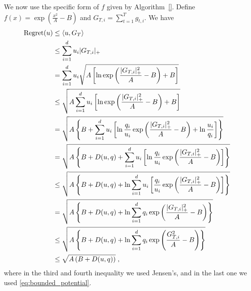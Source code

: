 We now use the specific form of $f$ given by Algorithm~\ref{}.
Define $f(x)= \exp(\frac{x^2}{A} - B)$ and $G_{T,i}=\sum_{t=1}^T g_{t,i}$.
We have
\begin{align*}
\operatorname{Regret}(u) & \le \langle u, G_T \rangle \\
& \le \sum_{i=1}^d u_i |G_{T,i}|_+ \\
& = \sum_{i=1}^d u_i \sqrt{A \left[\ln \exp\left(\frac{|G_{T,i}|_+^2}{A} - B\right)+B \right]} \\
& \le \sqrt{A \sum_{i=1}^d u_i \left[\ln \exp\left(\frac{|G_{T,i}|_+^2}{A} - B\right)+B \right]} \\
& = \sqrt{A \left\{B + \sum_{i=1}^d u_i \left[\ln \frac{q_i}{u_i}\exp\left(\frac{|G_{T,i}|_+^2}{A} - B \right) + \ln \frac{u_i}{q_i}\right]\right\}} \\
& = \sqrt{A \left\{B + D(u,q) + \sum_{i=1}^d u_i \left[\ln \frac{q_i}{u_i}\exp\left(\frac{|G_{T,i}|_+^2}{A} - B\right)\right]\right\}} \\
& \le \sqrt{A \left\{B + D(u,q) + \ln \sum_{i=1}^d u_i \left[ \frac{q_i}{u_i}\exp\left(\frac{|G_{T,i}|_+^2}{A} - B\right)\right]\right\}} \\
& = \sqrt{A \left\{B + D(u,q) + \ln \sum_{i=1}^d q_i\exp\left(\frac{|G_{T,i}|_+^2}{A}-B\right)\right\}} \\
& \le \sqrt{A \left\{B + D(u,q) + \ln \sum_{i=1}^d q_i\exp\left(\frac{G_{T,i}^2}{A}-B\right)\right\}} \\
& \le \sqrt{A \left(B + D(u,q)\right)} \; ,
\end{align*}
where in the third and fourth inequality we used Jensen's, and in the last one
we used \eqref{eq:bounded_potential}.
